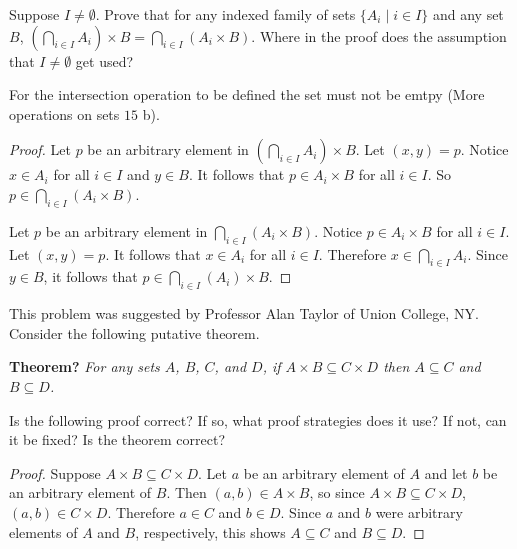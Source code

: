\begin{tcolorbox}[title=Problem 13, breakable]
    Suppose $I \not= \emptyset$. Prove that for any indexed family of sets $\{ A_i \mid i \in I\}$
    and any set $B$, $(\bigcap_{i \in I} A_i) \times B = \bigcap_{i \in I}(A_i \times B)$. Where
    in the proof does the assumption that $I \not= \emptyset$ get used?
\end{tcolorbox}

For the intersection operation to be defined the set must not be emtpy (More
operations on sets $15$ b).

\begin{proof}
    Let $p$ be an arbitrary element in $(\bigcap_{i \in I} A_i) \times B$.
    Let $(x, y) = p$.
    Notice $x \in A_i$ for all $i \in I$ and $y \in B$.
    It follows that $p \in A_i \times B$ for all $i \in I$.
    So $p \in \bigcap_{i \in I}(A_i \times B)$.

    Let $p$ be an arbitrary element in $\bigcap_{i \in I}(A_i \times B)$. Notice $p
        \in A_i \times B$ for all $i \in I$. Let $(x, y) = p$. It follows that $x \in
        A_i$ for all $i \in I$. Therefore $x \in \bigcap_{i \in I} A_i$. Since $y \in
        B$, it follows that $p \in \bigcap_{i \in I}(A_i) \times B$.
\end{proof}

\begin{tcolorbox}[title=Problem 15, breakable]
    This problem was suggested by Professor Alan Taylor of Union College, NY.
    Consider the following putative theorem.

    \textbf{Theorem?} \emph{For any sets $A$, $B$, $C$, and $D$, if $A \times B \subseteq C \times D$
        then $A \subseteq C$ and $B \subseteq D$.}

    Is the following proof correct? If so, what proof strategies does it use? If
    not, can it be fixed? Is the theorem correct?

    \begin{proof}
        Suppose $A \times B \subseteq C \times D$. Let $a$ be an arbitrary element of $A$
        and let $b$ be an arbitrary element of $B$. Then $(a, b) \in A \times B$, so 
        since $A \times B \subseteq C \times D$, $(a, b) \in C \times D$.
        Therefore $a \in C$ and $b \in D$. Since $a$ and $b$ were arbitrary elements of $A$ and $B$,
        respectively, this shows $A \subseteq C$ and $B \subseteq D$.
    \end{proof}
\end{tcolorbox}

